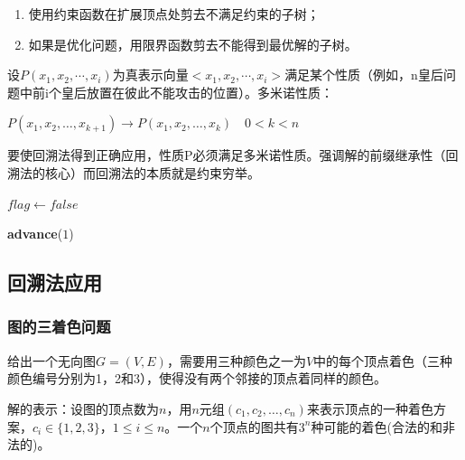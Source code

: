 \documentclass[./../main.tex]{subfiles}
\begin{document}
\begin{enumerate}
    \item 使用约束函数在扩展顶点处剪去不满足约束的子树；
    \item 如果是优化问题，用限界函数剪去不能得到最优解的子树。
\end{enumerate}

设$P(x_{1},x_{2},\cdots,x_{i})$为真表示向量$<x_{1},x_{2},\cdots,x_{i}>$满足某个性质（例如，n皇后问题中前i个皇后放置在彼此不能攻击的位置）。多米诺性质：

$P(x_{1},x_{2},\ldots,x_{k+1})\rightarrow P(x_{1},x_{2},\ldots,x_{k})\quad 0<k<n$

要使回溯法得到正确应用，性质P必须满足多米诺性质。强调解的前缀继承性（回溯法的核心）而回溯法的本质就是约束穷举。

\begin{algorithm}[H]
\caption{BACKTRACK（基于排列树的递归框架）}
\SetAlgoLined
{}

\BlankLine
{}
$flag \leftarrow false$\;

\textbf{advance}($1$)\;

\BlankLine
{}
\end{algorithm}


\subsection{回溯法应用}
\subsubsection{图的三着色问题}
给出一个无向图$G=(V,E)$，需要用三种颜色之一为$V$中的每个顶点着色（三种颜色编号分别为1，2和3），使得没有两个邻接的顶点着同样的颜色。

解的表示：设图的顶点数为$n$，用$n$元组$(c_{1},c_{2},\dots,c_{n})$来表示顶点的一种着色方案，$c_{i}\in \{1,2,3\}$，$1\leqslant i\leqslant n$。一个$n$个顶点的图共有$3^{n}$种可能的着色(合法的和非法的)。
\end{document}

